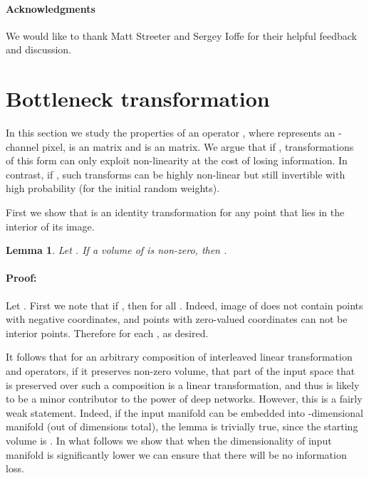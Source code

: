 \documentclass[10pt,twocolumn,letterpaper]{article}
\newenvironment{proof}{\paragraph{Proof:}}{}
\newtheorem{lemma}{Lemma}
\begin{document}
\paragraph{Acknowledgments} We would like to thank Matt Streeter and Sergey Ioffe for their helpful feedback and discussion.





\appendix
\def\vecs{{s_1,\dots,s_m}}
\def\interior{\operatorname{interior}}

\section{Bottleneck transformation}
\label{sec:appendix_bottle}



In this section we study the properties of an operator , where  represents an -channel pixel,  is an  matrix and  is an  matrix.
We argue that if , transformations of this form can only exploit non-linearity at the cost of losing information.
In contrast, if , such transforms can be highly non-linear but still invertible with high probability (for the initial random weights).

First we show that  is an identity transformation for any point that lies in the interior of its image.
\begin{lemma}
Let . If a volume of  is non-zero, then  .
\end{lemma}
\begin{proof}
Let . First we note that if , then  for
all . Indeed, image of  does not contain points with negative coordinates, and points with zero-valued coordinates can not be interior points. Therefore for each , 
as desired.
\end{proof}

It follows that for an arbitrary composition of interleaved linear transformation and  operators, if it preserves non-zero volume, that part of the input space  that is preserved over such a composition is a linear transformation, and thus is likely to be a minor contributor to the power of deep networks.
However, this is a fairly weak statement. Indeed, if the input manifold can be embedded into -dimensional manifold (out of  dimensions total), the lemma is trivially true, since the starting volume is . In what follows we show that when the dimensionality of input manifold is significantly lower we can ensure that there will be no information loss. 
\end{document}
